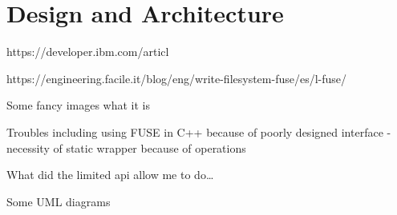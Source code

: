 \chapter{Design and Architecture}

https://developer.ibm.com/articl

https://engineering.facile.it/blog/eng/write-filesystem-fuse/es/l-fuse/

Some fancy images what it is

Troubles including using FUSE in C++ because of poorly designed interface - necessity of static wrapper because of operations

What did the limited api allow me to do\ldots

Some UML diagrams